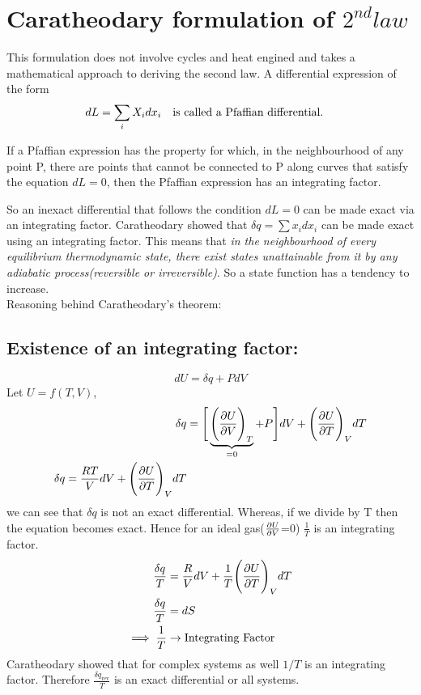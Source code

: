 \documentclass[12pt]{article}
\begin{document}
\section{Caratheodary formulation of $2^{nd} law$}
This formulation does not involve cycles and heat engined and takes a mathematical approach to deriving the second law. A differential expression of the form 
\begin{equation}
	dL=\sum_i X_i dx_i \qq{is called a Pfaffian differential.}
\end{equation}

\begin{tcolorbox}[title=Caratheodary's Theorem]
	If a Pfaffian expression has the property for which, in the neighbourhood of any point P, there are points that cannot be connected to P along curves that satisfy the equation $dL=0$, then the Pfaffian expression has an integrating factor.
\end{tcolorbox}
So an inexact differential that follows the condition $dL=0$ can be made exact via an integrating factor. Caratheodary showed that $\delta q=\sum x_i dx_i$ can be made exact using an integrating factor. This means that \textit{in the neighbourhood of every equilibrium thermodynamic state, there exist states unattainable from it by any adiabatic process(reversible or irreversible)}. So a state function has a tendency to increase. \\

Reasoning behind Caratheodary's theorem:\\
\subsection{Existence of an integrating factor:}\label{caratheo1}
$$dU=\delta q+PdV$$ Let $U=f(T,V)$,
\begin{align*}
	 \delta q&=\Bigg[\underbrace{\Bigg(\pdv{U}{V}\Bigg)_T}_{=0}+P\Bigg]dV+\Bigg(\pdv{U}{T}\Bigg)_VdT \\
	 \delta q=\frac{RT}{V}dV+\Bigg(\pdv{U}{T}\Bigg)_VdT \\
\end{align*}
we can see that $\delta q$ is not an exact differential. Whereas, if we divide by T then the equation becomes exact. Hence for an ideal gas($\pdv{U}{V}$=0) $\frac{1}{T}$ is an integrating factor. 
\begin{align}
	\dfrac{\delta q}{T}&=\frac{R}{V}dV+\frac{1}{T}\Bigg(\pdv{U}{T}\Bigg)_VdT\\
	\dfrac{\delta q}{T}&=dS\\
	\implies \frac{1}{T}&\to \text{Integrating Factor}
\end{align}
Caratheodary showed that for complex systems as well $1/T$ is an integrating factor. Therefore $\frac{\delta q_\text{rev}}{T}$ is an exact differential or all systems.
\end{document}
